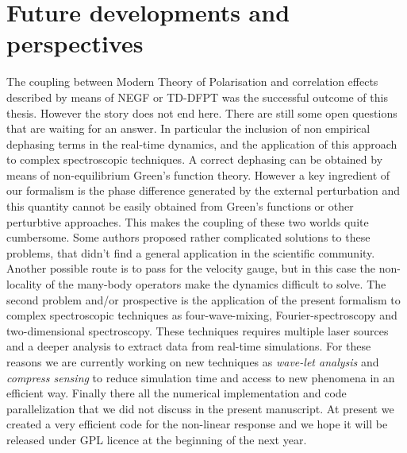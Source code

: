 \section*{Future developments and perspectives} 
The coupling between Modern Theory of Polarisation and correlation effects described by means of NEGF or TD-DFPT was the successful outcome of this thesis. However the story does not end here. There are still some open questions that are waiting for an answer. In particular the inclusion of non empirical dephasing terms in the real-time dynamics, and the application of this approach to complex spectroscopic techniques. A correct dephasing can be obtained by means of non-equilibrium Green's function theory. However a key ingredient of our formalism is the phase difference generated by the external perturbation and this quantity cannot be easily obtained from Green's functions or other perturbtive approaches. This makes the coupling of these two worlds quite cumbersome. Some authors proposed rather complicated solutions to these problems, that didn't find a general application in the scientific community. Another possible route is to pass for the velocity gauge, but in this case  the non-locality of the many-body operators make the dynamics difficult to solve.
The second problem and/or prospective is the application of the present formalism to complex spectroscopic techniques as four-wave-mixing, Fourier-spectroscopy and two-dimensional spectroscopy. These techniques requires multiple laser sources and  a deeper analysis to extract data from real-time simulations. For these reasons we are currently working on new techniques as {\it wave-let analysis} and {\it compress sensing} to reduce simulation time and access to new phenomena in an efficient way.
Finally there all the numerical implementation and code parallelization that we did not discuss in the present manuscript. At present we created a very efficient code for the non-linear response and we hope it will be released under GPL licence at the beginning of the next year.
